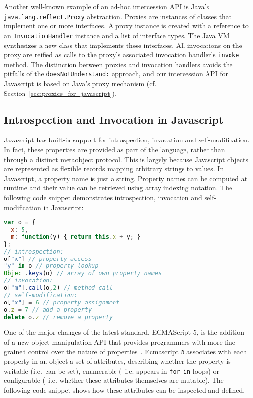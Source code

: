 \documentclass{acm_proc_article-sp}
\begin{document}
Another well-known example of an ad-hoc intercession API is Java's \texttt{java.lang.reflect.Proxy} abstraction. Proxies are instances of classes that implement one or more interfaces. A proxy instance is created with a reference to an \texttt{InvocationHandler} instance and a list of interface types. The Java VM synthesizes a new class that implements these interfaces. All invocations on the proxy are reified as calls to the proxy's associated invocation handler's \texttt{invoke} method. The distinction between proxies and invocation handlers avoids the pitfalls of the \texttt{doesNotUnderstand:} approach, and our intercession API for Javascript is based on Java's proxy mechanism (cf. Section~\ref{sec:proxies_for_javascript}).

\subsection{Introspection and Invocation in Javascript}
\label{sub:introspection_in_js}

Javascript has built-in support for introspection, invocation and self-modification. In fact, these properties are provided as part of the language, rather than through a distinct metaobject protocol. This is largely because Javascript objects are represented as flexible records mapping arbitrary strings to values. In Javascript, a property name is just a string. Property names can be computed at runtime and their value can be retrieved using array indexing notation. The following code snippet demonstrates introspection, invocation and self-modification in Javascript:

\begin{lstlisting}[language=javascript]
var o = {
  x: 5,
  m: function(y) { return this.x + y; }
};
// introspection:
o["x"] // property access
"y" in o // property lookup
Object.keys(o) // array of own property names
// invocation:
o["m"].call(o,2) // method call
// self-modification:
o["x"] = 6 // property assignment
o.z = 7 // add a property
delete o.z // remove a property
\end{lstlisting}

One of the major changes of the latest standard, ECMAScript 5, is the addition of a new object-manipulation API that provides programmers with more fine-grained control over the nature of properties~\cite{ecma262}. Ecmascript 5 associates with each property in an object a set of attributes, describing whether the property is writable (i.e.~can be set), enumerable (~i.e. appears in \texttt{for-in} loops) or configurable (~i.e. whether these attributes themselves are mutable). The following code snippet shows how these attributes can be inspected and defined.
\end{document}
